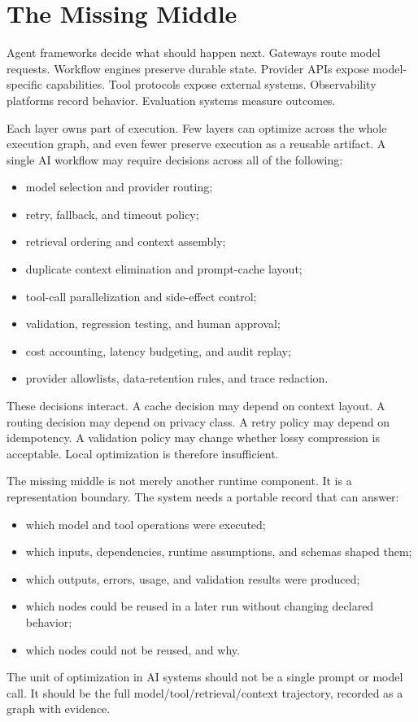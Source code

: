\section{The Missing Middle}

Agent frameworks decide what should happen next. Gateways route model requests. Workflow engines preserve durable state. Provider APIs expose model-specific capabilities. Tool protocols expose external systems. Observability platforms record behavior. Evaluation systems measure outcomes.

Each layer owns part of execution. Few layers can optimize across the whole execution graph, and even fewer preserve execution as a reusable artifact. A single AI workflow may require decisions across all of the following:

\begin{itemize}[leftmargin=1.5em]
  \item model selection and provider routing;
  \item retry, fallback, and timeout policy;
  \item retrieval ordering and context assembly;
  \item duplicate context elimination and prompt-cache layout;
  \item tool-call parallelization and side-effect control;
  \item validation, regression testing, and human approval;
  \item cost accounting, latency budgeting, and audit replay;
  \item provider allowlists, data-retention rules, and trace redaction.
\end{itemize}

These decisions interact. A cache decision may depend on context layout. A routing decision may depend on privacy class. A retry policy may depend on idempotency. A validation policy may change whether lossy compression is acceptable. Local optimization is therefore insufficient.

The missing middle is not merely another runtime component. It is a representation boundary. The system needs a portable record that can answer:

\begin{itemize}[leftmargin=1.5em]
  \item which model and tool operations were executed;
  \item which inputs, dependencies, runtime assumptions, and schemas shaped them;
  \item which outputs, errors, usage, and validation results were produced;
  \item which nodes could be reused in a later run without changing declared behavior;
  \item which nodes could not be reused, and why.
\end{itemize}

\begin{claim}
The unit of optimization in AI systems should not be a single prompt or model call. It should be the full model/tool/retrieval/context trajectory, recorded as a graph with evidence.
\end{claim}
